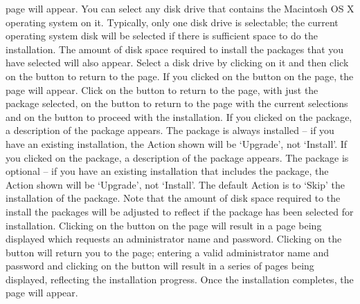  page will appear.
You can select any disk drive that contains the Macintosh OS X operating system on it.
Typically, only one disk drive is selectable; the current operating system disk will be
selected if there is sufficient space to do the installation.
The amount of disk space required to install the packages that you have selected will also
appear.
Select a disk drive by clicking on it and then click on the  button
to return to the  page.
\newpage
If you clicked on the  button on the 
page, the  page will appear.
Click on the  button to return to the
 page, with just the  package selected, on the
 button to return to the  page with the
current selections and on the  button to proceed with the
installation.
\newpage
If you clicked on the  package, a description of the package appears.
The  package is always installed -- if you have an existing \mplusm{}
installation, the Action shown will be `Upgrade', not `Install'.
\newpage
If you clicked on the  package, a description of the package appears.
The  package is optional -- if you have an existing \mplusm{}
installation that includes the  package, the Action shown will be
`Upgrade', not `Install'.
The default Action is to `Skip' the installation of the  package.
Note that the amount of disk space required to the install the packages will be adjusted
to reflect if the  package has been selected for installation.
\newpage
Clicking on the  button on the  page
will result in a page being displayed which requests an administrator name and password.
Clicking on the  button will return you to the
 page; entering a valid administrator name and password and
clicking on the  button will result in a series of pages
being displayed, reflecting the installation progress.
\newpage
Once the installation completes, the  page will appear.
